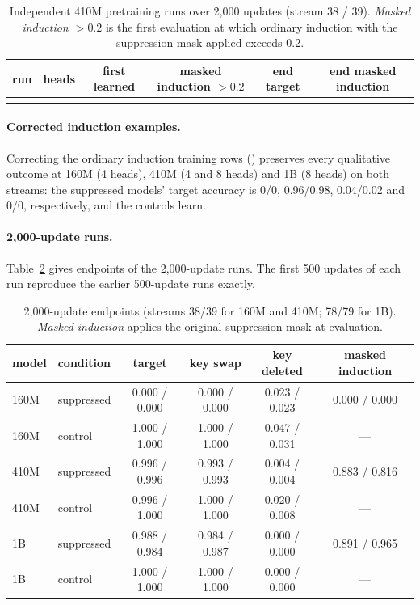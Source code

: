 \begin{table}[!htbp]
\centering\small
\caption{Independent 410M pretraining runs over 2,000 updates (stream 38 / 39).
\emph{Masked induction $>0.2$} is the first evaluation at which ordinary induction
with the suppression mask applied exceeds 0.2.}
\label{tab:replicates}
\begin{tabular}{lccccc}\toprule
run & heads & first learned & masked induction $>0.2$ & end target & end masked induction \\\midrule
{}{generated/tab_replicates.tex}
\bottomrule\end{tabular}
\end{table}

\paragraph{Corrected induction examples.}
Correcting the ordinary induction training rows ()
preserves every qualitative outcome at 160M (4 heads), 410M (4 and 8 heads) and 1B
(8 heads) on both streams: the suppressed models' target accuracy is 0/0,
0.96/0.98, 0.04/0.02 and 0/0, respectively, and the controls learn.

\paragraph{2,000-update runs.}
Table~\ref{tab:horizon} gives endpoints of the 2,000-update runs. The first 500
updates of each run reproduce the earlier 500-update runs exactly.

\begin{table}[!htbp]
\centering\small
\caption{2,000-update endpoints (streams 38/39 for 160M and 410M; 78/79 for 1B).
\emph{Masked induction} applies the original suppression mask at evaluation.}
\label{tab:horizon}
\begin{tabular}{llcccc}\toprule
model & condition & target & key swap & key deleted & masked induction \\
\midrule
160M & suppressed & 0.000 / 0.000 & 0.000 / 0.000 & 0.023 / 0.023 & 0.000 / 0.000 \\
160M & control & 1.000 / 1.000 & 1.000 / 1.000 & 0.047 / 0.031 & --- \\
410M & suppressed & 0.996 / 0.996 & 0.993 / 0.993 & 0.004 / 0.004 & 0.883 / 0.816 \\
410M & control & 0.996 / 1.000 & 1.000 / 1.000 & 0.020 / 0.008 & --- \\
1B & suppressed & 0.988 / 0.984 & 0.984 / 0.987 & 0.000 / 0.000 & 0.891 / 0.965 \\
1B & control & 1.000 / 1.000 & 1.000 / 1.000 & 0.000 / 0.000 & --- \\
\bottomrule\end{tabular}
\end{table}

